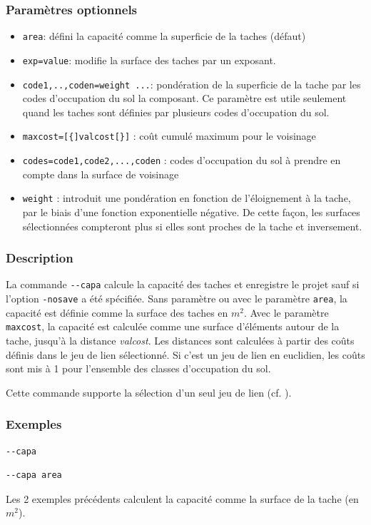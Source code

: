 \documentclass[a4paper,10pt]{report}
\begin{document}
\subsubsection{Paramètres optionnels}
\begin{itemize}
	\item \verb|area|: défini la capacité comme la superficie de la taches (défaut)
	\item \verb|exp=value|: modifie la surface des taches par un exposant.
	\item \verb|code1,..,coden=weight ...|: pondération de la superficie de la tache par les codes d'occupation du sol la composant. Ce paramètre est utile seulement quand les taches sont définies par plusieurs codes d'occupation du sol.
	\item \verb|maxcost=[{]valcost[}]| : coût cumulé maximum pour le voisinage
	\item \verb|codes=code1,code2,...,coden| : codes d'occupation du sol à prendre en compte dans la surface de voisinage
	\item \verb|weight| : introduit une pondération en fonction de l’éloignement à la tache, par le biais d’une fonction exponentielle négative. De cette façon, les surfaces sélectionnées compteront plus si elles sont proches de la tache et inversement.
\end{itemize}

\subsubsection{Description}
La commande \verb|--capa| calcule la capacité des taches et enregistre le projet sauf si l'option \verb|-nosave| a été spécifiée. Sans paramètre ou avec le paramètre \verb|area|, la capacité est définie comme la surface des taches en $m^2$. Avec le paramètre \verb|maxcost|, la capacité est calculée comme une surface d'éléments autour de la tache, jusqu'à la distance \textit{valcost}.
Les distances sont calculées à partir des coûts définis dans le jeu de lien sélectionné. Si c'est un jeu de lien en euclidien, les coûts sont mis à 1 pour l'ensemble des classes d'occupation du sol.

Cette commande supporte la sélection d'un seul jeu de lien (cf. ).

\subsubsection{Exemples}
\begin{Verbatim}
--capa
\end{Verbatim}
\begin{Verbatim}
--capa area
\end{Verbatim}
Les 2 exemples précédents calculent la capacité comme la surface de la tache (en $m^2$).
\end{document}

